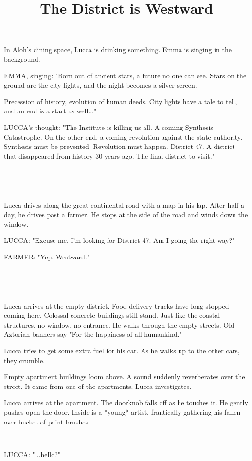\documentclass[11pt]{article}
\begin{document}
\ttfamily
\title{The District is Westward}
\maketitle

In Aloh's dining space, Lucca is drinking something.
Emma is singing in the background.

EMMA, singing: "Born out of ancient stars, a future no one can see.
Stars on the ground are the city lights, and the night becomes a silver screen.

Precession of history, evolution of human deeds.
City lights have a tale to tell, and an end is a start as well..."

LUCCA's thought: "The Institute is killing us all.
A coming Synthesis Catastrophe.
On the other end, a coming revolution against the state authority.
Synthesis must be prevented.
Revolution must happen.
District 47. 
A district that disappeared from history 30 years ago.
The final district to visit."

\ 

\ 

Lucca drives along the great continental road with a map in his lap.
After half a day, he drives past a farmer.
He stops at the side of the road and winds down the window.

LUCCA: "Excuse me, I'm looking for District 47. 
Am I going the right way?"

FARMER: "Yep. Westward."

\ 

\ 

Lucca arrives at the empty district.
Food delivery trucks have long stopped coming here.
Colossal concrete buildings still stand.
Just like the coastal structures, no window, no entrance.
He walks through the empty streets. 
Old Aztorian banners say "For the happiness of all humankind."

Lucca tries to get some extra fuel for his car.
As he walks up to the other cars, they crumble. 

Empty apartment buildings loom above. 
A sound suddenly reverberates over the street. 
It came from one of the apartments.
Lucca investigates.

Lucca arrives at the apartment.
The doorknob falls off as he touches it.
He gently pushes open the door.
Inside is a *young* artist, frantically gathering his fallen over bucket of paint brushes. 

\ 
 
LUCCA: "...hello?"
\end{document}
